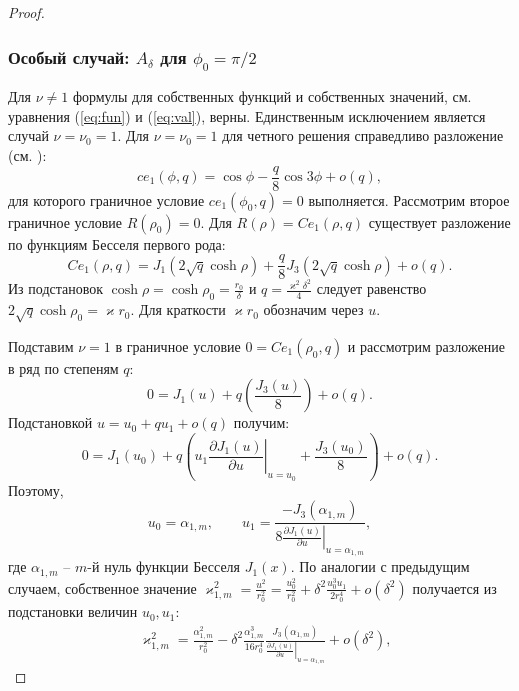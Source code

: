\begin{proof}
\subsubsection{Особый случай: $A_\delta$ для $\phi_0=\pi/2$}\label{sec:ch2/sec2/sub1/sub2}


Для $\nu\ne 1$ формулы для собственных функций и собственных значений, см. уравнения (\ref{eq:fun}) и (\ref{eq:val}), верны. Единственным исключением является случай  $\nu=\nu_0=1$.
Для $\nu=\nu_0=1$ для четного решения справедливо разложение (см. \cite[Subsect.~20.2.27]{wref2}):
\begin{equation*}
ce_1(\phi, q) = 	\cos{\phi}  - \frac{q}{8} \cos{3\phi} + o(q),
 \end{equation*}
для которого граничное условие  $ce_1(\phi_0, q)=0$ выполняется. 
Рассмотрим второе граничное условие $R(\rho_0) = 0$.
Для $R(\rho) = Ce_1(\rho, q)$ существует разложение по функциям Бесселя первого рода:
\begin{equation*}
Ce_1(\rho, q) = J_1(2\sqrt{q} \cosh{\rho}) + \frac{q}{8} J_3(2\sqrt{q}\cosh{\rho}) + o(q).
\end{equation*}
Из подстановок $\cosh\rho = \cosh\rho_0 =  \frac{r_0}{\delta}$ и $q = \frac{\varkappa^2 \delta^2}{4}$ следует равенство
$2\sqrt{q} \cosh{\rho_0} =  \varkappa r_0$. Для краткости $\varkappa r_0$ обозначим через $u$. 

Подставим $\nu = 1$ в граничное условие $0 = Ce_1(\rho_0, q)$ и рассмотрим разложение в ряд по степеням   $q$:
\begin{equation*}
    0 = J_1(u) + q \left( \frac{J_3(u)}{8} \right) + o(q).
\end{equation*}
Подстановкой  $u = u_0 + q u_1 + o(q)$ получим:
\begin{equation*}
    0 = 
    J_1(u_0) + q \left( 
    u_1 \left.\frac{\partial J_1 (u)}{\partial u}\right|_{u=u_0}
    + \frac{J_3(u_0)}{8}
    \right) + o(q).
\end{equation*}
Поэтому, 
\begin{equation*}
u_0 = \alpha_{1, m}, \qquad u_1 = 
\frac{ - J_3(\alpha_{1, m}) }{8\left.
\frac{\partial J_1 (u)}{\partial u}\right|_{u=\alpha_{1, m}}},
\end{equation*}
где $\alpha_{1, m}$ -- $m$-й нуль функции Бесселя  $J_1(x)$. По аналогии с предыдущим случаем,
собственное значение $\varkappa_{1, m}^2 = \frac{u^2}{r_0^2} = \frac{u_0^2}{r_0^2} + \delta^2 \frac{u_0^3 u_1}{2r_0^4} + o(\delta^2)$ получается из подстановки величин  $u_0, u_1$:
\begin{align}
   & \varkappa_{1, m}^2 = \frac{\alpha_{1, m}^2}{r_0^2} - \delta^2 \frac{\alpha_{1, m}^3}{16r_0^4} 
    \frac{J_3(\alpha_{1, m})}{\left.\frac{\partial J_1 (u)}{\partial u}\right|_{u=\alpha_{1, m}}} 
    + o(\delta^2), \label{eq:valS1}
    \end{align}

\end{proof}

